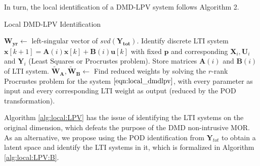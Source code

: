 In turn, the local identification of a DMD-LPV system follows Algorithm 2.


\begin{algorithm}
  \caption{Local DMD-LPV Identification \label{alg:local:LPV}}
  \begin{algorithmic}[1] 
    \State $\mathbf{W_{yr}} \gets$ left-singular vector of $svd(\mathbf{Y_{tot}})$.
    \State Identify discrete LTI system $\mathbf{x}[k+1] = \mathbf{A}(i)\mathbf{x}[k] + \mathbf{B}(i)\mathbf{u}[k]$ with fixed $\mathbf{p}$ and corresponding $\mathbf{X}_i,\mathbf{U}_i$ and $\mathbf{Y}_i$ (Least Squares or Procrustes problem).
    \State Store matrices $\mathbf{A}(i)$ and $\mathbf{B}(i)$ of LTI system.
    \EndFor
    \State $\mathbf{\widetilde{W}_A},\mathbf{\widetilde{W}_B} \gets$ Find reduced weights by solving the $r$-rank Procrustes problem for the system $\eqref{eqn:local_dmdlpv}$, with every parameter as input and every corresponding LTI weight as output (reduced by the POD transformation).
  \end{algorithmic}
\end{algorithm}

Algorithm \ref{alg:local:LPV} has the issue of identifying the LTI systems on the original dimension, which defeats the purpose of the DMD non-intrusive MOR.
%
As an alternative, we propose using the POD identification from $\mathbf{Y}_{tot}$ to obtain a latent space and identify the LTI systems in it, which is formalized in Algorithm \ref{alg:local:LPV:B}.


